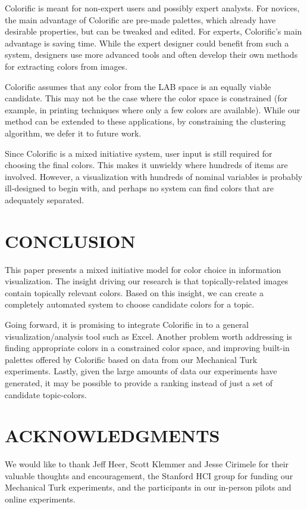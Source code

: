 \documentclass{article}
\newcommand{\system}{Colorific\xspace}
\begin{document}
 \system is meant for non-expert users and possibly expert analysts. 
 For novices, the main advantage of \system are pre-made palettes, which already have desirable properties, but can be tweaked and edited. For experts, \system's main advantage is saving time. While the expert designer could  benefit from such a system, designers use more advanced tools and often develop their own methods for extracting colors from images.
 
 \system assumes that any color from the LAB space is an equally viable candidate. This may not be the case where the color space is constrained (for example, in printing techniques where only a few colors are available). While our method can be extended to these applications, by constraining the clustering algorithm,  we defer it to future work.

 Since \system is a mixed initiative system, user input is still required for choosing the final colors. This makes it unwieldy where hundreds of items are involved. However, a visualization with hundreds of nominal variables is probably ill-designed to begin with, and perhaps no system can find colors that are adequately separated.

\section{CONCLUSION}
This paper presents a mixed initiative model for color choice in information visualization. The insight driving our research is that topically-related images contain topically relevant colors. Based on this insight, we can create a completely automated system to choose candidate colors for a topic.

Going forward, it is promising to integrate \system in to a general visualization/analysis tool such as Excel. Another problem worth addressing is finding appropriate colors in a constrained color space, and improving built-in palettes offered by \system based on data from our Mechanical Turk experiments. Lastly, given the large amounts of data our experiments have generated, it may be possible to provide a ranking instead of just a set of candidate topic-colors.

\section{ACKNOWLEDGMENTS} 
We would like to thank Jeff Heer, Scott Klemmer and Jesse Cirimele for their valuable thoughts and encouragement, the Stanford HCI group for funding our Mechanical Turk experiments, and the participants in our in-person pilots and online experiments.





\end{document}
